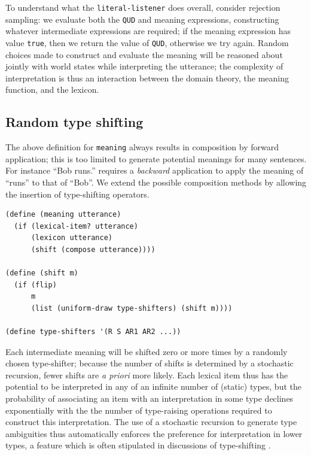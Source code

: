 \documentclass[pdfextras]{handbook}
\begin{document}
To understand what the \lstinline{literal-listener} does overall, consider rejection sampling: we evaluate both the \lstinline{QUD} and meaning expressions, constructing whatever intermediate expressions are required; if the meaning expression has value \lstinline{true}, then we return the value of \lstinline{QUD}, otherwise we try again. 
Random choices made to construct and evaluate the meaning will be reasoned about jointly with world states while interpreting the utterance; the complexity of interpretation is thus an interaction between the domain theory, the meaning function, and the lexicon.



\subsection{Random type shifting}
\label{typeshift}

The above definition for \lstinline{meaning} always results in composition by forward application; this is too limited to generate potential meanings for many sentences. For instance ``Bob runs.'' requires a \emph{backward} application to apply the meaning of ``runs'' to that of ``Bob''. We extend the possible composition methods by allowing the insertion of type-shifting operators.
\begin{lstlisting}
(define (meaning utterance)
  (if (lexical-item? utterance)
      (lexicon utterance)
      (shift (compose utterance))))
      
(define (shift m)
  (if (flip)
      m
      (list (uniform-draw type-shifters) (shift m))))
  
(define type-shifters '(R S AR1 AR2 ...))
\end{lstlisting}
Each intermediate meaning will be shifted zero or more times by a randomly chosen type-shifter; because the number of shifts is determined by a stochastic recursion, fewer shifts are \emph{a priori} more likely. 
Each lexical item thus has the potential to be interpreted in any of an infinite number of (static) types, but the probability of associating an item with an interpretation in some type declines exponentially with the the number of type-raising operations required to construct this interpretation. 
The use of a stochastic recursion to generate type ambiguities thus automatically enforces the preference for interpretation in lower types, a feature which is often stipulated in discussions of type-shifting \citep{partee1983generalized,partee1987noun}.
\end{document}
